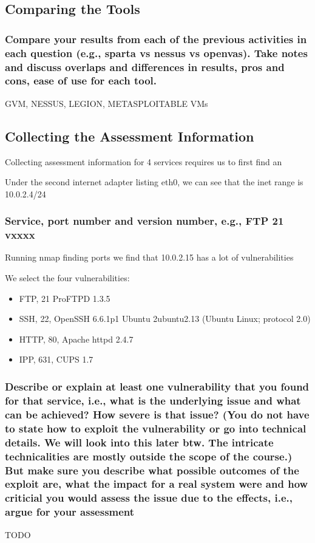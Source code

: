 \subsection{Comparing the Tools}
\subsubsection{Compare your results from each of the previous activities in each question (e.g., sparta vs nessus vs openvas). Take notes and discuss overlaps and differences in results, pros and cons, ease of use for each tool.}

GVM, NESSUS, LEGION, METASPLOITABLE VMs

\subsection{Collecting the Assessment Information}
Collecting assessment information for 4 services requires us to first find an


Under the second internet adapter listing eth0, we can see that the inet range is 10.0.2.4/24

\subsubsection{Service, port number and version number, e.g., FTP 21 vxxxx}

Running nmap finding ports we find that 10.0.2.15 has a lot of vulnerabilities


We select the four vulnerabilities:
\begin{itemize}
    \item FTP, 21 ProFTPD 1.3.5
    \item SSH, 22, OpenSSH 6.6.1p1 Ubuntu 2ubuntu2.13 (Ubuntu Linux; protocol 2.0)
    \item HTTP, 80, Apache httpd 2.4.7
    \item IPP, 631, CUPS 1.7
\end{itemize}
\subsubsection{Describe or explain at least one vulnerability that you found for that service, i.e., what is the underlying issue and what can be achieved? How severe is that issue? (You do not have to state how to exploit the vulnerability or go into technical details. We will look into this later btw. The intricate technicalities are mostly outside the scope of the course.) But make sure you describe what possible outcomes of the exploit are, what the impact for a real system were and how criticial you would assess the issue due to the effects, i.e., argue for your assessment}
TODO

